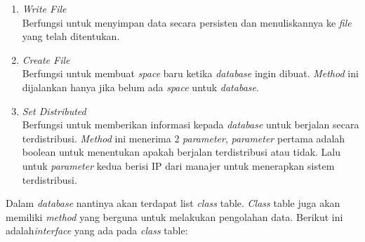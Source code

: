 \begin{enumerate}
	\item \emph{Write File} \\
  Berfungsi untuk menyimpan data secara persisten dan menuliskannya ke \emph{file} yang 
  telah ditentukan.


	\item \emph{Create File} \\
  Berfungsi untuk membuat \emph{space} baru ketika \emph{database} ingin dibuat. \emph{Method} ini 
  dijalankan hanya jika belum ada \emph{space} untuk \emph{database}.


	\item \emph{Set Distributed} \\
  Berfungsi untuk memberikan informasi kepada \emph{database} untuk berjalan secara 
  terdistribusi. \emph{Method} ini menerima 2 \emph{parameter}, \emph{parameter} pertama adalah boolean 
  untuk menentukan apakah berjalan terdistribusi atau tidak. Lalu untuk \emph{parameter} 
  kedua berisi IP dari manajer untuk menerapkan sistem terdistribusi. 
  
\end{enumerate}

Dalam \emph{database} nantinya akan terdapat list \emph{class} table. \emph{Class} table juga akan memiliki \emph{method} yang berguna untuk melakukan pengolahan data. Berikut ini adalah\emph{interface} yang ada pada \emph{class} table:

